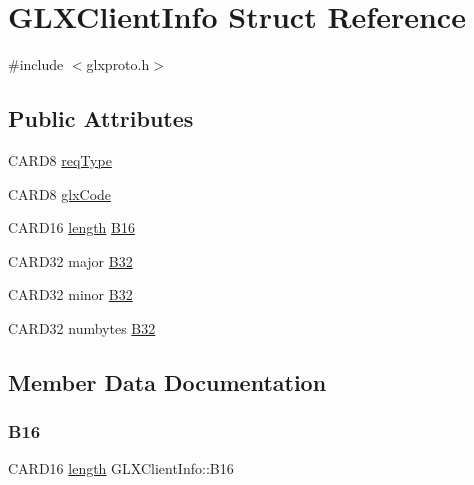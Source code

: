 \hypertarget{struct_g_l_x_client_info}{}\section{G\+L\+X\+Client\+Info Struct Reference}
\label{struct_g_l_x_client_info}


{\ttfamily \#include $<$glxproto.\+h$>$}

\subsection*{Public Attributes}
\begin{DoxyCompactItemize}
\item 
C\+A\+R\+D8 \hyperlink{struct_g_l_x_client_info_a99de1c887d3b31ebab165cf4bc2cf565}{req\+Type}
\item 
C\+A\+R\+D8 \hyperlink{struct_g_l_x_client_info_a81c593d5749318fb1a115be38c1762ad}{glx\+Code}
\item 
C\+A\+R\+D16 \hyperlink{glcorearb_8h_ab9c919755bde3b34349e23a32b4e0fa7}{length} \hyperlink{struct_g_l_x_client_info_a4c4dc78cb8f71953c7787b1eb29f8de9}{B16}
\item 
C\+A\+R\+D32 major \hyperlink{struct_g_l_x_client_info_a7aba976e2b67e9dec75f13e249e89498}{B32}
\item 
C\+A\+R\+D32 minor \hyperlink{struct_g_l_x_client_info_aff84a367432d0354c4c141e8b24b6f87}{B32}
\item 
C\+A\+R\+D32 numbytes \hyperlink{struct_g_l_x_client_info_a7cb659e263bb2427507175ce0b908da0}{B32}
\end{DoxyCompactItemize}


\subsection{Member Data Documentation}
\mbox{\label{struct_g_l_x_client_info_a4c4dc78cb8f71953c7787b1eb29f8de9}} 
\subsubsection{\texorpdfstring{B16}{B16}}
{\footnotesize\ttfamily C\+A\+R\+D16 \hyperlink{glcorearb_8h_ab9c919755bde3b34349e23a32b4e0fa7}{length} G\+L\+X\+Client\+Info\+::\+B16}

\mbox{\label{struct_g_l_x_client_info_a7aba976e2b67e9dec75f13e249e89498}} 
